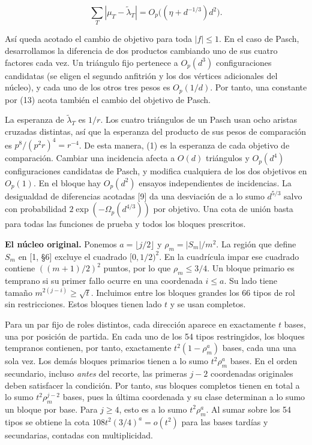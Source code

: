 \documentclass[spanish,11pt,a4paper]{article}
\begin{document}
\[\sum_T|\mu_T-\widetilde\lambda_T|
     =O_p\big((\eta+d^{-1/3})d^2\big).
\tag{13}\]

Así queda acotado el cambio de objetivo para toda \(|f|\le1\). En el caso de Pasch, desarrollamos la diferencia de dos productos cambiando uno de sus cuatro factores cada vez. Un triángulo fijo pertenece a \(O_p(d^3)\) configuraciones candidatas (se eligen el segundo anfitrión y los dos vértices adicionales del núcleo), y cada uno de los otros tres pesos es \(O_p(1/d)\). Por tanto, una constante por (13) acota también el cambio del objetivo de Pasch.

La esperanza de \(\widetilde\lambda_T\) es \(1/r\). Los cuatro triángulos de un Pasch usan ocho aristas cruzadas distintas, así que la esperanza del producto de sus pesos de comparación es \(p^8/(p^2r)^4=r^{-4}\). De esta manera, (1) es la esperanza de cada objetivo de comparación. Cambiar una incidencia afecta a \(O(d)\) triángulos y \(O_p(d^4)\) configuraciones candidatas de Pasch, y modifica cualquiera de los dos objetivos en \(O_p(1)\). En el bloque hay \(O_p(d^2)\) ensayos independientes de incidencias. La desigualdad de diferencias acotadas {[}9{]} da una desviación de a lo sumo \(d^{5/3}\) salvo con probabilidad \(2\exp(-\Omega_p(d^{4/3}))\) por objetivo. Una cota de unión basta para todas las funciones de prueba y todos los bloques prescritos.

\textbf{El núcleo original.} Ponemos \(a=\lfloor j/2\rfloor\) y \(\rho_m=|S_m|/m^2\). La región que define \(S_m\) en {[}1, §6{]} excluye el cuadrado \([0,1/2)^2\). En la cuadrícula impar ese cuadrado contiene \(((m+1)/2)^2\) puntos, por lo que \(\rho_m\le 3/4\). Un bloque primario es temprano si su primer fallo ocurre en una coordenada \(i\le a\). Su lado tiene tamaño \(m^{2(j-i)}\ge\sqrt t\). Incluimos entre los bloques grandes los 66 tipos de rol sin restricciones. Estos bloques tienen lado \(t\) y se usan completos.

Para un par fijo de roles distintos, cada dirección aparece en exactamente \(t\) bases, una por posición de partida. En cada uno de los 54 tipos restringidos, los bloques tempranos contienen, por tanto, exactamente \(t^2(1-\rho_m^a)\) bases, cada una una sola vez. Los demás bloques primarios tienen a lo sumo \(t^2\rho_m^a\) bases. En el orden secundario, incluso \emph{antes} del recorte, las primeras \(j-2\) coordenadas originales deben satisfacer la condición. Por tanto, sus bloques completos tienen en total a lo sumo \(t^2\rho_m^{j-2}\) bases, pues la última coordenada y su clase determinan a lo sumo un bloque por base. Para \(j\ge4\), esto es a lo sumo \(t^2\rho_m^a\). Al sumar sobre los 54 tipos se obtiene la cota \(108t^2(3/4)^a=o(t^2)\) para las bases tardías y secundarias, contadas con multiplicidad.
\end{document}
